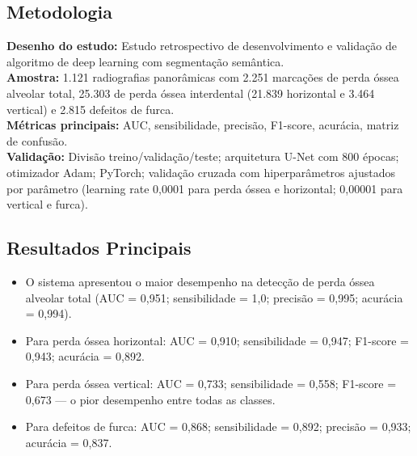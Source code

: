 \subsection{Metodologia}
\textbf{Desenho do estudo:} Estudo retrospectivo de desenvolvimento e
validação de algoritmo de deep learning com segmentação semântica. \\
\textbf{Amostra:} 1.121 radiografias panorâmicas com 2.251 marcações de
perda óssea alveolar total, 25.303 de perda óssea interdental (21.839
horizontal e 3.464 vertical) e 2.815 defeitos de furca. \\
\textbf{Métricas principais:} AUC, sensibilidade, precisão, F1-score,
acurácia, matriz de confusão. \\
\textbf{Validação:} Divisão treino/validação/teste; arquitetura U-Net
com 800 épocas; otimizador Adam; PyTorch; validação cruzada com
hiperparâmetros ajustados por parâmetro (learning rate 0,0001 para perda
óssea e horizontal; 0,00001 para vertical e furca).

\subsection{Resultados Principais}
\begin{itemize}
  \item O sistema apresentou o maior desempenho na detecção de perda óssea
        alveolar total (AUC = 0,951; sensibilidade = 1,0; precisão = 0,995;
        acurácia = 0,994).
  \item Para perda óssea horizontal: AUC = 0,910; sensibilidade = 0,947;
        F1-score = 0,943; acurácia = 0,892.
  \item Para perda óssea vertical: AUC = 0,733; sensibilidade = 0,558;
        F1-score = 0,673 — o pior desempenho entre todas as classes.
  \item Para defeitos de furca: AUC = 0,868; sensibilidade = 0,892;
        precisão = 0,933; acurácia = 0,837.
\end{itemize}

